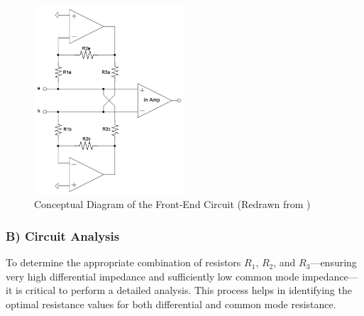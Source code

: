 \begin{figure}[ht]
	\centering
	\includegraphics[width=0.5\textwidth]{images/frontend circuit}
	\caption{Conceptual Diagram of the Front-End Circuit (Redrawn from \cite{Dobrev_2008})}
	\label{fig:front_end_circuit}
\end{figure}


\subsubsection*{B) Circuit Analysis}
To determine the appropriate combination of resistors \(R_1\), \(R_2\), and \(R_3\)—ensuring very high differential impedance and sufficiently low common mode impedance—it is critical to perform a detailed analysis. This process helps in identifying the optimal resistance values for both differential and common mode resistance.

